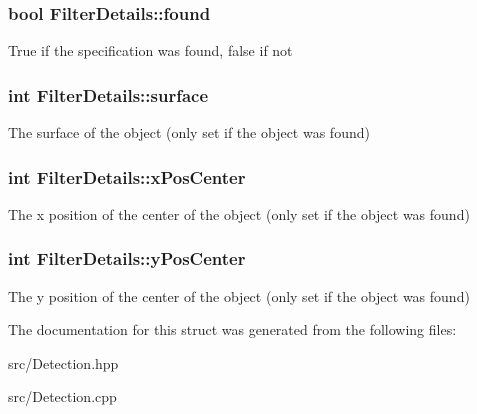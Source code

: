 \subsubsection[{\texorpdfstring{found}{found}}]{\setlength{\rightskip}{0pt plus 5cm}bool Filter\+Details\+::found}\hypertarget{structFilterDetails_ae022d744143354507ecb4a46c4c4dcf4}{}\label{structFilterDetails_ae022d744143354507ecb4a46c4c4dcf4}
True if the specification was found, false if not 
\subsubsection[{\texorpdfstring{surface}{surface}}]{\setlength{\rightskip}{0pt plus 5cm}int Filter\+Details\+::surface}\hypertarget{structFilterDetails_ae5c1354aeca0877f498f6e05853aedf4}{}\label{structFilterDetails_ae5c1354aeca0877f498f6e05853aedf4}
The surface of the object (only set if the object was found) 
\subsubsection[{\texorpdfstring{x\+Pos\+Center}{xPosCenter}}]{\setlength{\rightskip}{0pt plus 5cm}int Filter\+Details\+::x\+Pos\+Center}\hypertarget{structFilterDetails_a93a398ce2876fd270232559ab29b79ce}{}\label{structFilterDetails_a93a398ce2876fd270232559ab29b79ce}
The x position of the center of the object (only set if the object was found) 
\subsubsection[{\texorpdfstring{y\+Pos\+Center}{yPosCenter}}]{\setlength{\rightskip}{0pt plus 5cm}int Filter\+Details\+::y\+Pos\+Center}\hypertarget{structFilterDetails_a68c1cab0adbbfb1ffff14518fdc2295e}{}\label{structFilterDetails_a68c1cab0adbbfb1ffff14518fdc2295e}
The y position of the center of the object (only set if the object was found) 

The documentation for this struct was generated from the following files\+:\begin{DoxyCompactItemize}
\item 
src/Detection.\+hpp\item 
src/Detection.\+cpp\end{DoxyCompactItemize}
